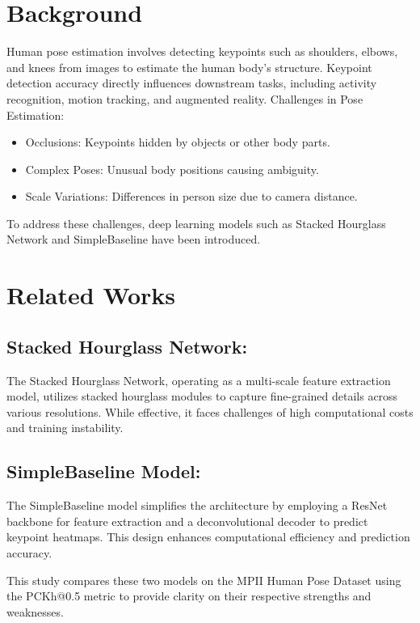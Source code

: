 \documentclass{article}
\begin{document}
\section{Background}
\label{gen_inst}

Human pose estimation involves detecting keypoints such as shoulders, elbows, and knees from images to estimate the human body’s structure. Keypoint detection accuracy directly influences downstream tasks, including activity recognition, motion tracking, and augmented reality.
Challenges in Pose Estimation:

\begin{itemize}
\item Occlusions: Keypoints hidden by objects or other body parts.
\item Complex Poses: Unusual body positions causing ambiguity.
\item Scale Variations: Differences in person size due to camera distance.


\end{itemize}

To address these challenges, deep learning models such as Stacked Hourglass Network and SimpleBaseline have been introduced.

\section{Related Works}
\label{headings}

\subsection{Stacked Hourglass Network:}
The Stacked Hourglass Network, operating as a multi-scale feature extraction model, utilizes stacked hourglass modules to capture fine-grained details across various resolutions. While effective, it faces challenges of high computational costs and training instability.

\subsection{SimpleBaseline Model:}
The SimpleBaseline model simplifies the architecture by employing a ResNet backbone for feature extraction and a deconvolutional decoder to predict keypoint heatmaps. This design enhances computational efficiency and prediction accuracy.

This study compares these two models on the MPII Human Pose Dataset using the PCKh@0.5 metric to provide clarity on their respective strengths and weaknesses.
\end{document}

